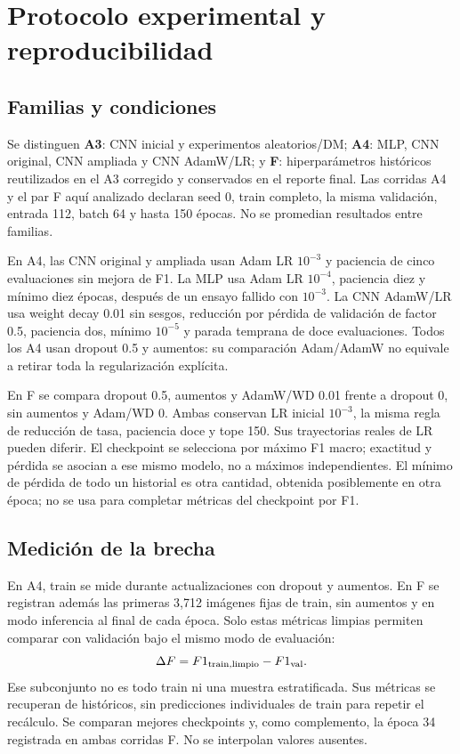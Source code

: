 \section{Protocolo experimental y reproducibilidad}
\subsection{Familias y condiciones}
Se distinguen \textbf{A3}: CNN inicial y experimentos aleatorios/DM;
\textbf{A4}: MLP, CNN original, CNN ampliada y CNN AdamW/LR; y
\textbf{F}: hiperparámetros históricos reutilizados en el A3 corregido y
conservados en el reporte final. Las corridas A4 y el par F aquí analizado
declaran seed 0, train completo, la misma validación, entrada 112,
batch 64 y hasta 150 épocas. No se promedian resultados entre familias.

En A4, las CNN original y ampliada usan Adam LR $10^{-3}$ y paciencia de cinco
evaluaciones sin mejora de F1. La MLP usa Adam LR $10^{-4}$, paciencia diez y
mínimo diez épocas, después de un ensayo fallido con $10^{-3}$. La CNN AdamW/LR
usa weight decay 0.01 sin sesgos, reducción por pérdida de validación de factor
0.5, paciencia dos, mínimo $10^{-5}$ y parada temprana de doce evaluaciones.
Todos los A4 usan dropout 0.5 y aumentos: su comparación Adam/AdamW no equivale
a retirar toda la regularización explícita.

En F se compara dropout 0.5, aumentos y AdamW/WD 0.01 frente a dropout 0,
sin aumentos y Adam/WD 0. Ambas conservan LR inicial $10^{-3}$, la misma regla
de reducción de tasa, paciencia doce y tope 150. Sus trayectorias reales de LR
pueden diferir. El checkpoint se selecciona por máximo F1 macro; exactitud y
pérdida se asocian a ese mismo modelo, no a máximos independientes.
El mínimo de pérdida de todo un historial es otra cantidad, obtenida posiblemente
en otra época; no se usa para completar métricas del checkpoint por F1.

\subsection{Medición de la brecha}
En A4, train se mide durante actualizaciones con dropout y aumentos. En F se
registran además las primeras 3,712 imágenes fijas de train, sin aumentos y en
modo inferencia al final de cada época. Solo estas métricas limpias permiten
comparar con validación bajo el mismo modo de evaluación:
\begin{equation}
\Delta F=F1_{\rm train,limpio}-F1_{\rm val}.
\end{equation}
Ese subconjunto no es todo train ni una muestra estratificada. Sus métricas
se recuperan de históricos, sin predicciones individuales de train para repetir
el recálculo. Se comparan mejores checkpoints y, como complemento, la época
34 registrada en ambas corridas F. No se interpolan valores ausentes.

